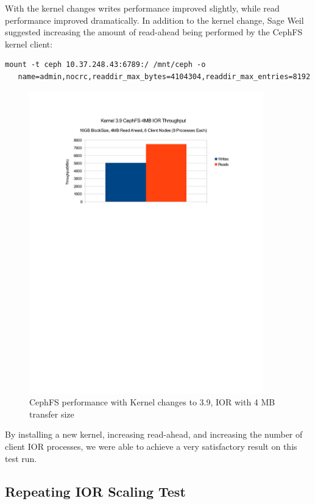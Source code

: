\documentclass{article}
\begin{document}
With the kernel changes writes performance improved slightly, while read
performance improved dramatically.  In addition to the kernel change, Sage Weil
suggested increasing the amount of read-ahead being performed by the CephFS
kernel client:

\begin{Verbatim}[samepage=true]
mount -t ceph 10.37.248.43:6789:/ /mnt/ceph -o
   name=admin,nocrc,readdir_max_bytes=4104304,readdir_max_entries=8192
\end{Verbatim}


\begin{figure}[htb]
\centering
\includegraphics[width=4in]{ior-kernel-39}
\caption{CephFS performance with Kernel changes to 3.9, IOR with 4 MB transfer
size}
\label{fig:ior-kernel-39}
\end{figure}


By installing a new kernel, increasing read-ahead, and increasing the number of
client IOR processes, we were able to achieve a very satisfactory result on this
test run.


\subsection{Repeating IOR Scaling Test}
\end{document}
